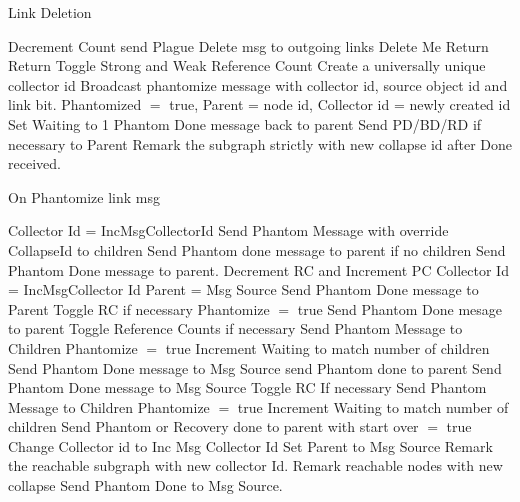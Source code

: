 \documentclass{article}
\begin{document}
\begin{algorithm}
\caption{Link Deletion}
\label{Link Deletion}
\begin{algorithmic}[1]
\State Decrement Count
\State send Plague Delete msg to outgoing links
\EndIf
{}
\State Delete Me
\State Return
\State Return
\State Toggle Strong and Weak Reference Count
\State Create a universally unique collector id
\State Broadcast phantomize message with collector id, source object id and link bit.
\EndFor
\State Phantomized $=$ true, Parent = node id, Collector id = newly created id
\State Set Waiting to 1
\State Phantom Done message back to parent
\EndIf
{}
\State Send PD/BD/RD if necessary to Parent
\State Remark the subgraph strictly with new collapse id after Done received.
\EndIf
\EndProcedure
\end{algorithmic}
\end{algorithm}	

\begin{algorithm}
\caption{On Phantomize link msg}
\label{Phantom message received}
\begin{algorithmic}[1]
\State Collector Id = IncMsgCollectorId
\State Send Phantom Message with override CollapseId to children
\State Send Phantom done message to parent if no children
\Else
\State Send Phantom Done message to parent.
\EndIf
\Else
\State Decrement RC and Increment PC
\State Collector Id = IncMsgCollector Id
\State Parent = Msg Source
\State Send Phantom Done message to Parent
\State Toggle RC if necessary
\State Phantomize $=$ true
\State Send Phantom Done mesage to parent
\Else
\State Toggle Reference Counts if necessary
\State Send Phantom Message to Children
\State Phantomize $=$ true
\State Increment Waiting to match number of children
\EndIf
{}
\State Send Phantom Done message to Msg Source
\State send Phantom done to parent
\State Send Phantom Done message to Msg Source
\Else
\State Toggle RC If necessary
\State Send Phantom Message to Children
\State Phantomize $=$ true
\State Increment Waiting to match number of children
\EndIf
{}
\State Send Phantom or Recovery done to parent with start over $=$ true
\State Change Collector id to Inc Msg Collector Id
\State Set Parent to Msg Source
\State Remark the reachable subgraph with new collector Id.
\Else
{}
\State Remark reachable nodes with new collapse
\Else
\State Send Phantom Done to Msg Source.
\EndIf
\EndIf
\EndIf
\EndProcedure
\end{algorithmic}
\end{algorithm}	
	
\end{document}
